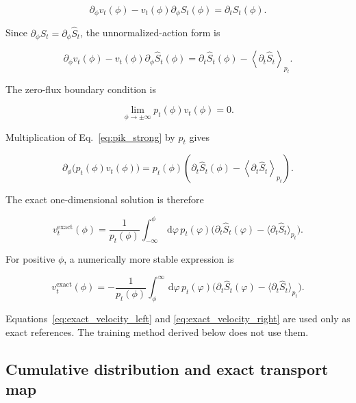 \documentclass[reprint,twocolumn,superscriptaddress,preprintnumbers,amsmath,amssymb,aps,prd,floatfix]{revtex4-2}
\newcommand{\dd}{\,\mathrm{d}}
\begin{document}
\begin{equation}
 \partial_\phi v_t(\phi)
 -
 v_t(\phi)\partial_\phi S_t(\phi)
 =
 \partial_tS_t(\phi).
 \label{eq:pik_normalized}
\end{equation}

Since $\partial_\phi S_t=\partial_\phi\hat S_t$, the unnormalized-action form is

\begin{equation}
 \partial_\phi v_t(\phi)
 -
 v_t(\phi)\partial_\phi\hat S_t(\phi)
 =
 \partial_t\hat S_t(\phi)
 -
 \left\langle\partial_t\hat S_t\right\rangle_{p_t}.
 \label{eq:pik_strong}
\end{equation}

The zero-flux boundary condition is

\begin{equation}
 \lim_{\phi\to\pm\infty}
 p_t(\phi)v_t(\phi)
 =
 0.
 \label{eq:zero_flux}
\end{equation}

Multiplication of Eq.~\eqref{eq:pik_strong} by $p_t$ gives

\begin{equation}
 \partial_\phi\bigl(p_t(\phi)v_t(\phi)\bigr)
 =
 p_t(\phi)
 \left(
 \partial_t\hat S_t(\phi)
 -
 \left\langle\partial_t\hat S_t\right\rangle_{p_t}
 \right).
\end{equation}

The exact one-dimensional solution is therefore

\begin{equation}
 v_t^{\mathrm{exact}}(\phi)
 =
 \frac{1}{p_t(\phi)}
 \int_{-\infty}^{\phi}\dd\varphi\,
 p_t(\varphi)
 \bigl(
 \partial_t\hat S_t(\varphi)
 -
 \langle\partial_t\hat S_t\rangle_{p_t}
 \bigr).
 \label{eq:exact_velocity_left}
\end{equation}

For positive $\phi$, a numerically more stable expression is

\begin{equation}
 v_t^{\mathrm{exact}}(\phi)
 =
 -\frac{1}{p_t(\phi)}
 \int_{\phi}^{\infty}\dd\varphi\,
 p_t(\varphi)
 \bigl(
 \partial_t\hat S_t(\varphi)
 -
 \langle\partial_t\hat S_t\rangle_{p_t}
 \bigr).
 \label{eq:exact_velocity_right}
\end{equation}

Equations~\eqref{eq:exact_velocity_left} and \eqref{eq:exact_velocity_right} are used only as exact references. The training method derived below does not use them.

\subsection{Cumulative distribution and exact transport map}
\end{document}
